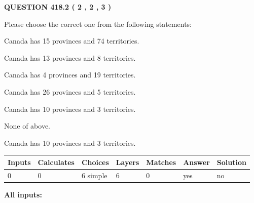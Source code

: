 \documentclass[12pt]{article}
\begin{document}
   
  
\vspace{0.2in}
  
{\textbf{\Large{QUESTION
418.2 
 ( 2 , 2 , 3 )
}}}
  
  
Please choose the correct one from the following statements:
 
 
Canada has  15 provinces and  74 territories.
 
 
Canada has  13 provinces and  8 territories.
 
 
Canada has   4 provinces and  19 territories.
 
 
Canada has  26 provinces and  5 territories.
 
 
Canada has 10  provinces and 3 territories.
 
 
 None of above.
 
 
\noindent{}
 
 
Canada has 10  provinces and 3 territories.
 
 
\noindent{}
 
 
   
   
   
   
\noindent\begin{tabular}{|l|l|l|l|l|l|l|}
 \hline
Inputs & Calculates & Choices & Layers & Matches & Answer & Solution \\ \hline
 0  & 
 0  & 
 6
  simple  
  & 
 6  & 
 0  & 
  yes & 
  no 
  \\ \hline
 \end{tabular}
   
   
   
   
\noindent{}
   
   
   
   
\noindent\vspace{0.1in}\hspace{-0.08in} {\textbf{\Large{All inputs: }}}
   
   
   
   
   
   
 \vspace{0.2in}
 
\end{document}

